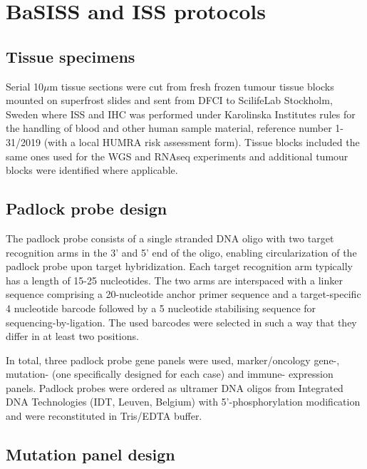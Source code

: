\section{\acs{BaSISS} and \acs{ISS} protocols}
\label{sec:protocol-suppl-basiss-iss}

\subsection{Tissue specimens}
Serial 10$\mu$m tissue sections were cut from fresh frozen tumour tissue blocks mounted on superfrost slides and sent from DFCI to ScilifeLab Stockholm, Sweden where \ac{ISS} and \ac{IHC} was performed under Karolinska Institutes rules for the handling of blood and other human sample material, reference number 1-31/2019 (with a local HUMRA risk assessment form). Tissue blocks included the same ones used for the \ac{WGS} and RNAseq experiments and additional tumour blocks were identified where applicable.

\subsection{Padlock probe design}

The padlock probe consists of a single stranded DNA oligo with two target recognition arms in the 3' and 5' end of the oligo, enabling circularization of the padlock probe upon target hybridization. Each target recognition arm typically has a length of 15-25 nucleotides. The two arms are interspaced with a linker sequence comprising a 20-nucleotide anchor primer sequence and a target-specific 4 nucleotide barcode followed by a 5 nucleotide stabilising sequence for sequencing-by-ligation. The used barcodes were selected in such a way that they differ in at least two positions.

In total, three padlock probe gene panels were used, marker/oncology gene-, mutation- (one specifically designed for each case) and immune- expression panels. Padlock probes were ordered as ultramer DNA oligos from Integrated DNA Technologies (IDT, Leuven, Belgium) with 5'-phosphorylation modification and were reconstituted in Tris/EDTA buffer.

\subsection{Mutation panel design}
\label{sec:protocol-suppl-mutation-panel}

